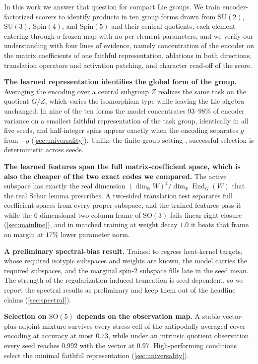 \documentclass{article}
\DeclareMathOperator{\End}{End}
\newcommand{\SU}{\mathrm{SU}}
\newcommand{\SO}{\mathrm{SO}}
\newcommand{\Spin}{\mathrm{Spin}}
\newcommand{\R}{\mathbb{R}}
\begin{document}
In this work we answer that question for compact Lie groups. We train
encoder-factorized scorers to identify products in ten group forms drawn
from $\SU(2)$, $\SU(3)$, $\Spin(4)$, and $\Spin(5)$ and their central
quotients, each element entering through a frozen map with no
per-element parameters, and we verify our understanding with four lines
of evidence, namely concentration of the encoder on the matrix
coefficients of one faithful representation, ablations in both
directions, translation operators and activation patching, and character
read-off of the score.

\textbf{The learned representation identifies the global form of the
group.} Averaging the encoding over a central subgroup $Z$ realizes the
same task on the quotient $G/Z$, which varies the isomorphism type while
leaving the Lie algebra unchanged. In nine of the ten forms the model
concentrates $93$--$98\%$ of encoder variance on a smallest faithful
representation of the task group, identically in all five seeds, and
half-integer spins appear exactly when the encoding separates $g$ from
$-g$ (\cref{sec:universality}). Unlike the finite-group setting
\cite{chughtai2023}, successful selection is deterministic across seeds.

\textbf{The learned features span the full matrix-coefficient space,
which is also the cheaper of the two exact codes we compared.} The
active subspace has exactly the real dimension $(\dim_\R W)^2/\dim_\R
\End_G(W)$ that the real Schur lemma prescribes. A two-sided translation
test separates full coefficient spaces from every proper subspace, and
the trained features pass it while the $6$-dimensional two-column frame
of $\SO(3)$ fails linear right closure (\cref{sec:mainline}), and in matched training at weight decay $1.0$ it
beats that frame on margin at $17\%$ lower parameter norm.

\textbf{A preliminary spectral-bias result.} Trained to regress
heat-kernel targets, whose required isotypic subspaces and weights are
known, the model carries the required subspaces, and the marginal
spin-$2$ subspace fills late in the seed mean. The strength of the
regularization-induced truncation is seed-dependent, so we report the
spectral results as preliminary and keep them out of the headline claims
(\cref{sec:spectral}).

\textbf{Selection on $\SO(5)$ depends on the observation map.} A stable
vector-plus-adjoint mixture survives every stress cell of the
antipodally averaged cover encoding at accuracy at most $0.73$, while
under an intrinsic quotient observation every seed reaches $0.992$ with
the vector at $0.97$. High-performing conditions select the minimal
faithful representation (\cref{sec:universality}).
\end{document}
